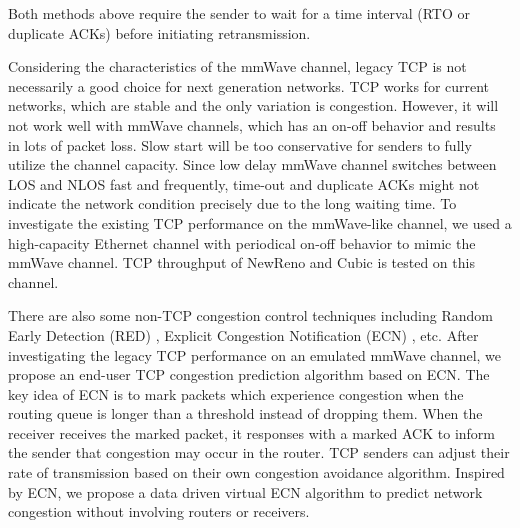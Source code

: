 Both methods above require the sender to wait for a time interval (RTO or duplicate ACKs) before initiating retransmission. 
\par Considering the characteristics of the mmWave channel, legacy TCP is not necessarily a good choice for next generation networks. TCP works for current networks, which are stable and the only variation is congestion. However, it will not work well with mmWave channels, which has an on-off behavior and results in lots of packet loss. Slow start will be too conservative for senders to fully utilize the channel capacity. Since low delay mmWave channel switches between LOS and NLOS fast and frequently, time-out and duplicate ACKs might not indicate the network condition precisely due to the long waiting time. To investigate the existing TCP performance on the mmWave-like channel, we used a high-capacity Ethernet channel with periodical on-off behavior to mimic the mmWave channel. TCP throughput of NewReno and Cubic \cite{grieco2004performance, ha2008cubic} is tested on this channel. 
\par There are also some non-TCP congestion control techniques including Random Early Detection (RED) \cite{lin1997dynamics}, Explicit Congestion Notification (ECN) \cite{ramakrishnan2001rfc}, etc. After investigating the legacy TCP performance on an emulated mmWave channel, we propose an end-user TCP congestion prediction algorithm based on ECN. The key idea of ECN is to mark packets which experience congestion when the routing queue is longer than a threshold instead of dropping them. When the receiver receives the marked packet, it responses with a marked ACK to inform the sender that congestion may occur in the router. TCP senders can adjust their rate of transmission based on their own congestion avoidance algorithm. Inspired by ECN, we propose a data driven virtual ECN algorithm to predict network congestion without involving routers or receivers.
